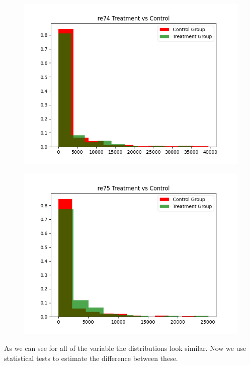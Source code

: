 \documentclass{article}
\begin{document}
\begin{figure}
    \centering
    \includegraphics[width = 15 cm]{../re74_cts_hist_plot.png}
\end{figure}

\begin{figure}
    \centering
    \includegraphics[width = 15 cm]{../re75_cts_hist_plot.png}
\end{figure}
\clearpage

As we can see for all of the variable the distributions look similar.
Now we use statistical tests to estimate the difference between these.\\
\end{document}
